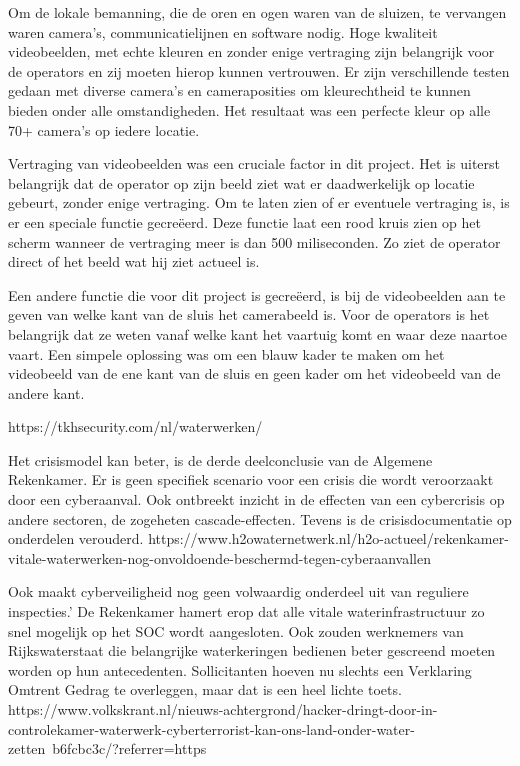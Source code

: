 Om de lokale bemanning, die de oren en ogen waren van de sluizen, te vervangen waren camera’s, communicatielijnen en software nodig. Hoge kwaliteit videobeelden, met echte kleuren en zonder enige vertraging zijn belangrijk voor de operators en zij moeten hierop kunnen vertrouwen. Er zijn verschillende testen gedaan met diverse camera’s en cameraposities om kleurechtheid te kunnen bieden onder alle omstandigheden. Het resultaat was een perfecte kleur op alle 70+ camera’s op iedere locatie.

Vertraging van videobeelden was een cruciale factor in dit project. Het is uiterst belangrijk dat de operator op zijn beeld ziet wat er daadwerkelijk op locatie gebeurt, zonder enige vertraging. Om te laten zien of er eventuele vertraging is, is er een speciale functie gecreëerd. Deze functie laat een rood kruis zien op het scherm wanneer de vertraging meer is dan 500 miliseconden. Zo ziet de operator direct of het beeld wat hij ziet actueel is. 

Een andere functie die voor dit project is gecreëerd, is bij de videobeelden aan te geven van welke kant van de sluis het camerabeeld is. Voor de operators is het belangrijk dat ze weten vanaf welke kant het vaartuig komt en waar deze naartoe vaart. Een simpele oplossing was om een blauw kader te maken om het videobeeld van de ene kant van de sluis en geen kader om het videobeeld van de andere kant. 

https://tkhsecurity.com/nl/waterwerken/

Het crisismodel kan beter, is de derde deelconclusie van de Algemene Rekenkamer. Er is geen specifiek scenario voor een crisis die wordt veroorzaakt door een cyberaanval. Ook ontbreekt inzicht in de effecten van een cybercrisis op andere sectoren, de zogeheten cascade-effecten. Tevens is de crisisdocumentatie op onderdelen verouderd.
https://www.h2owaternetwerk.nl/h2o-actueel/rekenkamer-vitale-waterwerken-nog-onvoldoende-beschermd-tegen-cyberaanvallen


Ook maakt cyberveiligheid nog geen volwaardig onderdeel uit van reguliere inspecties.’ De Rekenkamer hamert erop dat alle vitale waterinfrastructuur zo snel mogelijk op het SOC wordt aangesloten. Ook zouden werknemers van Rijkswaterstaat die belangrijke waterkeringen bedienen beter gescreend moeten worden op hun antecedenten. Sollicitanten hoeven nu slechts een Verklaring Omtrent Gedrag te overleggen, maar dat is een heel lichte toets.
https://www.volkskrant.nl/nieuws-achtergrond/hacker-dringt-door-in-controlekamer-waterwerk-cyberterrorist-kan-ons-land-onder-water-zetten~b6fcbc3c/?referrer=https%

